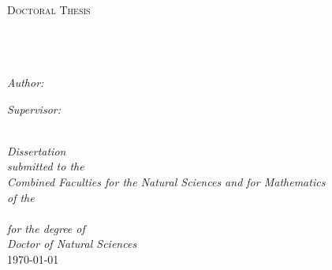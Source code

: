 \documentclass[
11pt, %
german, english,%
singlespacing, %
headsepline, %
]{MastersDoctoralThesis} %
\begin{document}

\begin{titlepage}
\begin{center}

\textsc{\LARGE \univname}\\[1.5cm] %
\textsc{\Large Doctoral Thesis}\\[0.5cm] %

\HRule \\[0.4cm] %
{\huge \bfseries \ttitle}\\[0.4cm] %
\HRule \\[1.5cm] %
 
\begin{minipage}{0.4\textwidth}
\begin{flushleft} \large
\emph{Author:}\\
\href{http://www.thphys.uni-heidelberg.de/~casas/}{\authorname} %
\end{flushleft}
\end{minipage}
\begin{minipage}{0.4\textwidth}
\begin{flushright} \large
\emph{Supervisor:} \\
\href{https://valeriapettorino.wordpress.com/}{\supname} %
\end{flushright}
\end{minipage}\\[3cm]
 

\large 
\textit{Dissertation\\
submitted to the\\
Combined Faculties for the Natural Sciences and for Mathematics\\
of the} \\ 
\univname
\\[0.2cm]
\textit{for the degree of\\
Doctor of Natural Sciences} \\[2cm]
 

{\large \today}\\[4cm] %
 
\vfill
\end{center}
\end{titlepage}
\end{document}
